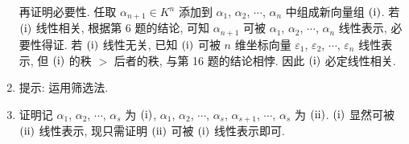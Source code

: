 \documentclass[a4paper, 11pt]{ctexart}
\begin{document}
\begin{enumerate}
            再证明必要性. 任取 $\alpha_{n+1} \in K^n$ 添加到 $\alpha_1$, $\alpha_2$, $\cdots$, $\alpha_n$ 中组成新向量组 $(\mathrm{\uppercase\expandafter{\romannumeral1}})$. 若 $(\mathrm{\uppercase\expandafter{\romannumeral1}})$ 线性相关, 根据{\heiti 第 6 题}的结论, 可知 $\alpha_{n+1}$ 可被 $\alpha_1$, $\alpha_2$, $\cdots$, $\alpha_n$ 线性表示, 必要性得证.
            若 $(\mathrm{\uppercase\expandafter{\romannumeral1}})$ 线性无关, 已知 $(\mathrm{\uppercase\expandafter{\romannumeral1}})$ 可被 $n$ 维坐标向量 $\varepsilon_1$, $\varepsilon_2$, $\cdots$, $\varepsilon_n$ 线性表示, 但 $(\mathrm{\uppercase\expandafter{\romannumeral1}})$ 的秩 $>$ 后者的秩, 与{\heiti 第 16 题}的结论相悖. 因此 $(\mathrm{\uppercase\expandafter{\romannumeral1}})$ 必定线性相关.
        \item %
            提示: 运用筛选法.
        \item %
            {\heiti 证明}\quad 记 $\alpha_1$, $\alpha_2$, $\cdots$, $\alpha_s$ 为 $(\mathrm{\uppercase\expandafter{\romannumeral1}})$,
            $\alpha_1$, $\alpha_2$, $\cdots$, $\alpha_s$, $\alpha_{s+1}$, $\cdots$, $\alpha_s$ 为 $(\mathrm{\uppercase\expandafter{\romannumeral2}})$.
            $(\mathrm{\uppercase\expandafter{\romannumeral1}})$ 显然可被 $(\mathrm{\uppercase\expandafter{\romannumeral2}})$ 线性表示, 现只需证明 $(\mathrm{\uppercase\expandafter{\romannumeral2}})$ 可被 $(\mathrm{\uppercase\expandafter{\romannumeral1}})$ 线性表示即可.


\end{enumerate}
\end{document}
